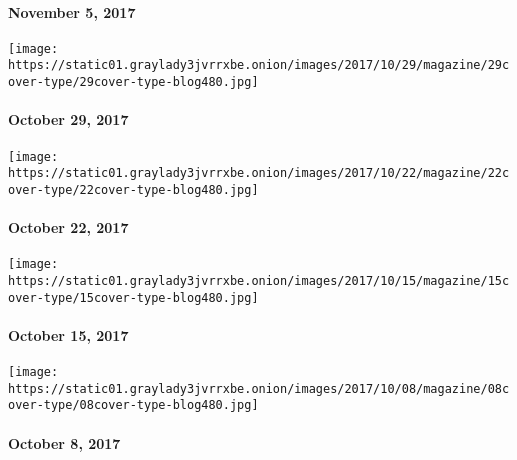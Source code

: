 \hypertarget{november-5-2017}{%
\paragraph{November 5, 2017}\label{november-5-2017}}

\href{https://www.nytimes3xbfgragh.onion/issue/magazine/2017/10/27/102917-issue}{}

\texttt{[image: https://static01.graylady3jvrrxbe.onion/images/2017/10/29/magazine/29cover-type/29cover-type-blog480.jpg]}

\hypertarget{october-29-2017}{%
\paragraph{October 29, 2017}\label{october-29-2017}}

\href{https://www.nytimes3xbfgragh.onion/issue/magazine/2017/10/20/102217-issue}{}

\texttt{[image: https://static01.graylady3jvrrxbe.onion/images/2017/10/22/magazine/22cover-type/22cover-type-blog480.jpg]}

\hypertarget{october-22-2017}{%
\paragraph{October 22, 2017}\label{october-22-2017}}

\href{https://www.nytimes3xbfgragh.onion/issue/magazine/2017/10/13/101517-issue}{}

\texttt{[image: https://static01.graylady3jvrrxbe.onion/images/2017/10/15/magazine/15cover-type/15cover-type-blog480.jpg]}

\hypertarget{october-15-2017}{%
\paragraph{October 15, 2017}\label{october-15-2017}}

\href{https://www.nytimes3xbfgragh.onion/issue/magazine/2017/10/06/100817-issue}{}

\texttt{[image: https://static01.graylady3jvrrxbe.onion/images/2017/10/08/magazine/08cover-type/08cover-type-blog480.jpg]}

\hypertarget{october-8-2017}{%
\paragraph{October 8, 2017}\label{october-8-2017}}

\href{https://www.nytimes3xbfgragh.onion/issue/magazine/2017/09/29/100117-issue}{}

